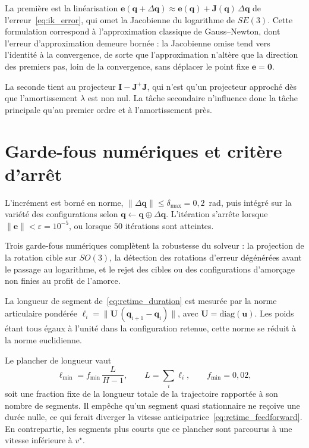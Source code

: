 La première est la linéarisation $\mathbf{e}(\mathbf{q}+\Delta\mathbf{q})\approx\mathbf{e}(\mathbf{q})+\mathbf{J}(\mathbf{q})\,\Delta\mathbf{q}$ de l'erreur~\eqref{eq:ik_error}, qui omet la Jacobienne du logarithme de $SE(3)$. Cette formulation correspond à l'approximation classique de Gauss--Newton, dont l'erreur d'approximation demeure bornée : la Jacobienne omise tend vers l'identité à la convergence, de sorte que l'approximation n'altère que la direction des premiers pas, loin de la convergence, sans déplacer le point fixe $\mathbf{e}=\mathbf{0}$.

La seconde tient au projecteur $\mathbf{I}-\mathbf{J}^{+}\mathbf{J}$, qui n'est qu'un projecteur approché dès que l'amortissement $\lambda$ est non nul. La tâche secondaire n'influence donc la tâche principale qu'au premier ordre et à l'amortissement près.

\section*{Garde-fous numériques et critère d'arrêt}

L'incrément est borné en norme, $\|\Delta\mathbf{q}\|\le\delta_{\max}=0{,}2$~rad, puis intégré sur la variété des configurations selon $\mathbf{q}\leftarrow\mathbf{q}\oplus\Delta\mathbf{q}$. L'itération s'arrête lorsque $\|\mathbf{e}\|<\varepsilon=10^{-5}$, ou lorsque $50$ itérations sont atteintes.

Trois garde-fous numériques complètent la robustesse du solveur : la projection de la rotation cible sur $SO(3)$, la détection des rotations d'erreur dégénérées avant le passage au logarithme, et le rejet des cibles ou des configurations d'amorçage non finies au profit de l'amorce.

La longueur de segment de~\eqref{eq:retime_duration} est mesurée par la norme articulaire pondérée $\ell_i = \| \mathbf{U}\,(\mathbf{q}_{i+1}-\mathbf{q}_i)\|$, avec $\mathbf{U} = \mathrm{diag}(\mathbf{u})$. Les poids étant tous égaux à l'unité dans la configuration retenue, cette norme se réduit à la norme euclidienne.

Le plancher de longueur vaut
\begin{equation}
  \ell_{\min} = f_{\min}\,\frac{L}{H-1},
  \qquad
  L=\sum_i \ell_i,
  \qquad
  f_{\min}=0{,}02,
\end{equation}
soit une fraction fixe de la longueur totale de la trajectoire rapportée à son nombre de segments. Il empêche qu'un segment quasi stationnaire ne reçoive une durée nulle, ce qui ferait diverger la vitesse anticipatrice~\eqref{eq:retime_feedforward}. En contrepartie, les segments plus courts que ce plancher sont parcourus à une vitesse inférieure à $v^{\star}$.

